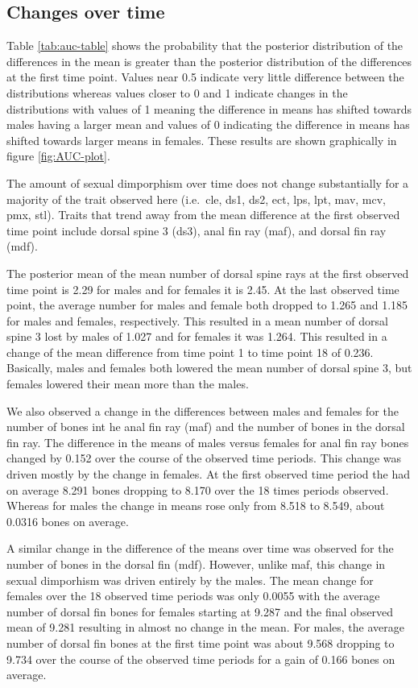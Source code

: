 \documentclass[
  12pt,
]{article}
\begin{document}
\hypertarget{changes-over-time}{%
\subsection{Changes over time}\label{changes-over-time}}

Table \ref{tab:auc-table} shows the probability that the posterior
distribution of the differences in the mean is greater than the
posterior distribution of the differences at the first time point.
Values near 0.5 indicate very little difference between the
distributions whereas values closer to 0 and 1 indicate changes in the
distributions with values of 1 meaning the difference in means has
shifted towards males having a larger mean and values of 0 indicating
the difference in means has shifted towards larger means in females.
These results are shown graphically in figure \ref{fig:AUC-plot}.

The amount of sexual dimporphism over time does not change substantially
for a majority of the trait observed here (i.e.~cle, ds1, ds2, ect, lps,
lpt, mav, mcv, pmx, stl). Traits that trend away from the mean
difference at the first observed time point include dorsal spine 3
(ds3), anal fin ray (maf), and dorsal fin ray (mdf).

The posterior mean of the mean number of dorsal spine rays at the first
observed time point is 2.29 for males and for females it is 2.45. At the
last observed time point, the average number for males and female both
dropped to 1.265 and 1.185 for males and females, respectively. This
resulted in a mean number of dorsal spine 3 lost by males of 1.027 and
for females it was 1.264. This resulted in a change of the mean
difference from time point 1 to time point 18 of 0.236. Basically, males
and females both lowered the mean number of dorsal spine 3, but females
lowered their mean more than the males.

We also observed a change in the differences between males and females
for the number of bones int he anal fin ray (maf) and the number of
bones in the dorsal fin ray. The difference in the means of males versus
females for anal fin ray bones changed by 0.152 over the course of the
observed time periods. This change was driven mostly by the change in
females. At the first observed time period the had on average 8.291
bones dropping to 8.170 over the 18 times periods observed. Whereas for
males the change in means rose only from 8.518 to 8.549, about 0.0316
bones on average.

A similar change in the difference of the means over time was observed
for the number of bones in the dorsal fin (mdf). However, unlike maf,
this change in sexual dimporhism was driven entirely by the males. The
mean change for females over the 18 observed time periods was only
0.0055 with the average number of dorsal fin bones for females starting
at 9.287 and the final observed mean of 9.281 resulting in almost no
change in the mean. For males, the average number of dorsal fin bones at
the first time point was about 9.568 dropping to 9.734 over the course
of the observed time periods for a gain of 0.166 bones on average.
\end{document}
